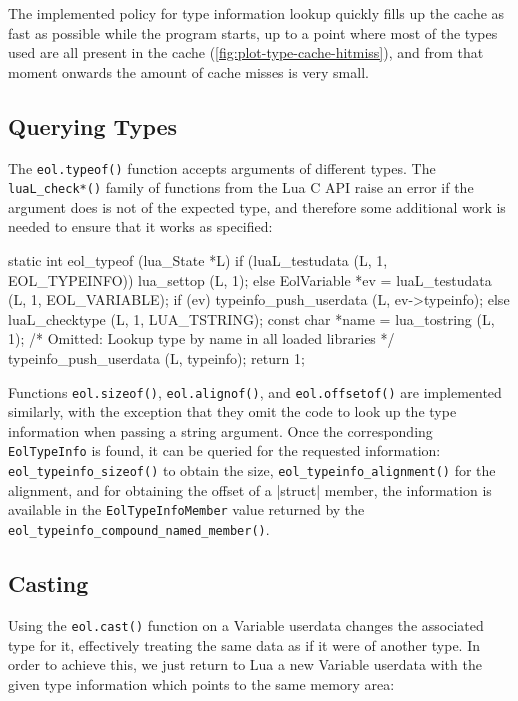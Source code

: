 The implemented policy for type information lookup quickly fills up the cache
as fast as possible while the program starts, up to a point where most of the
types used are all present in the cache
(\autoref{fig:plot-type-cache-hitmiss}), and from that moment onwards the
amount of cache misses is very small. 


\subsection{Querying Types}

The \verb|eol.typeof()| function accepts arguments of different types.
The \verb|luaL_check*()| family of functions from the Lua C API raise an error
if the argument does is not of the expected type, and therefore some
additional work is needed to ensure that it works as specified:

\begin{ccode}
static int
eol_typeof (lua_State *L) {
  if (luaL_testudata (L, 1, EOL_TYPEINFO)) {
    lua_settop (L, 1);
  } else {
    EolVariable *ev = luaL_testudata (L, 1, EOL_VARIABLE);
    if (ev) {
      typeinfo_push_userdata (L, ev->typeinfo);
    } else {
      luaL_checktype (L, 1, LUA_TSTRING);
      const char *name = lua_tostring (L, 1);
      /* Omitted: Lookup type by name in all loaded libraries */
      typeinfo_push_userdata (L, typeinfo);
    }
  }
  return 1;
}
\end{ccode}

Functions \verb|eol.sizeof()|, \verb|eol.alignof()|, and \verb|eol.offsetof()|
are implemented similarly, with the exception that they omit the code to
look up the type information when passing a string argument. Once the
corresponding \verb|EolTypeInfo| is found, it can be queried for the requested
information: \verb|eol_typeinfo_sizeof()| to obtain the size,
\verb|eol_typeinfo_alignment()| for the alignment, and for obtaining the
offset of a \Mc|struct| member, the information is available in the
\verb|EolTypeInfoMember| value returned by the
\verb|eol_typeinfo_compound_named_member()|.

\subsection{Casting}

Using the \verb|eol.cast()| function on a \textsf{Variable} userdata changes
the associated type for it, effectively treating the same data as if it were
of another type. In order to achieve this, we just return to Lua a new
\textsf{Variable} userdata with the given type information which points to
the same memory area:

